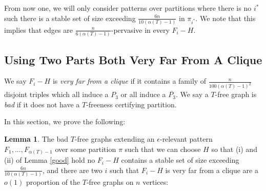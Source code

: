 \documentclass[12pt]{article}
\theoremstyle{definition}
\newtheorem{lemma}[theorem]{Lemma}
\begin{document}
 From now one, we will only consider patterns over partitions where there is  no  $i^*$  such there is a stable set of size exceeding $ \frac{6n}{10(\alpha(T)-1)}$ in  $\pi_{i^*}$.  
 We note that this implies that edges are $\frac{n}{6(\alpha(T)-1)}$-pervasive in every $F_i-H$. 

 
\subsection{Using Two Parts Both Very Far From A Clique} 

We say $F_i-H$ is {\it very far from a clique} if it contains a family of 
 $\frac{n}{100(\alpha(T)-1)^2}$  disjoint triples which all induce a $P_3$ or all induce a $\overline{P_3}$.
 We say a $T$-free graph is {\it bad } if it does not have a $T$-freeness certifying partition. 


 
 In this section,  we prove the following: 


\begin{lemma}\label{notwofarfromclique}
The  bad $T$-free  graphs extending an $\epsilon$-relevant pattern $F_1,...,F_{\alpha(T)-1}$  over some partition $\pi$ such that we can choose $H$ so that  (i) and (ii) of Lemma \ref{good} hold  no $F_i-H$ contains  a stable set of size exceeding $ \frac{6n}{10(\alpha(T)-1)}$,   and there are two $i$ such that $F_i-H$ is very far from a clique are   a $o(1)$ proportion of the $T$-free graphs on $n$ vertices:
\end{lemma}
\end{document}

